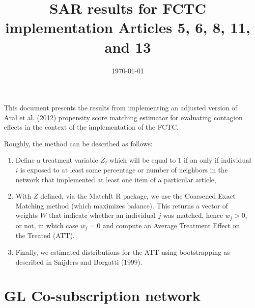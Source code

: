 \documentclass[10pt]{article}
\title{SAR results for FCTC implementation Articles 5, 6, 8, 11, and 13}
\date{\today}
\begin{document}
\maketitle
\tableofcontents

This document presents the results from implementing an adjusted version of Aral et al. (2012)
propensity score matching estimator for evaluating contagion effects in the context of
the implementation of the FCTC.

Roughly, the method can be described as follows:

\begin{enumerate}
\item Define a treatment variable $Z_i$ which will be equal to 1 if an only
if individual $i$ is exposed to at least some percentage or number of neighbors
in the network that implemented at least one item of a particular article,
\item With $Z$ defined, via the MatchIt R package, we use the Coarsened
Exact Matching method (which maximizes balance). This returns a vector of weights $W$ that indicate whether
an individual $j$ was matched, hence $w_j>0$, or not, in which case $w_j=0$ and
compute an Average Treatment Effect on the Treated (ATT).
\item Finally, we estimated distributions for the ATT using bootstrapping
as described in Snijders and Borgatti (1999).
\end{enumerate}

\section{GL Co-subscription network}
\end{document}
